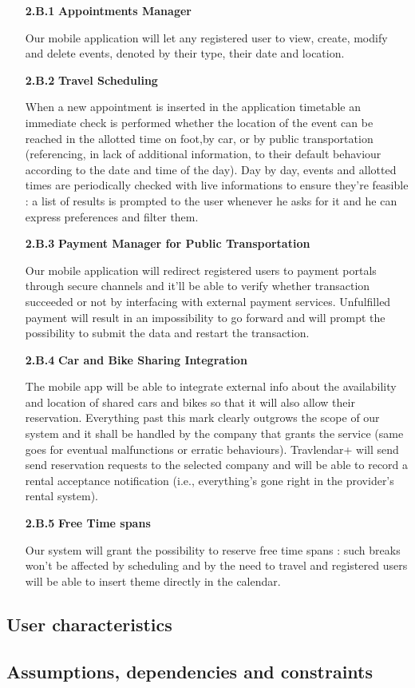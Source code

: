 		\begin{enumerate}

		\item
		[\textbf{2.B.1}] \textbf{Appointments Manager}
		
Our mobile application will let any registered user to view, create, modify and delete events, denoted by their type, their date and location. \\

		\item
		[\textbf{2.B.2}] \textbf{Travel Scheduling}

When a new appointment is inserted in the application timetable an immediate check is performed whether the location of the event can be reached in the allotted time on foot,by car, or by public transportation (referencing, in lack of additional information, to their default behaviour according to the date and time of the day).
Day by day, events and allotted times are periodically checked with live informations to ensure they’re feasible : a list of results is prompted to the user whenever he asks for it and he can express preferences and filter them.\\

		\item
		[\textbf{2.B.3}] \textbf{Payment Manager for Public Transportation}

Our mobile application will redirect registered users to payment portals through secure channels and it’ll be able to verify whether transaction succeeded or not by interfacing with external payment services.
Unfulfilled payment will result in an impossibility to go forward and will prompt the possibility to submit the data and restart the transaction.\\

		\item
		[\textbf{2.B.4}] \textbf{Car and Bike Sharing Integration}

The mobile app will be able to integrate external info about the availability and location of shared cars and bikes so that it will also allow their reservation.
Everything past this mark clearly outgrows the scope of our system and it shall be handled by the company that grants the service (same goes for eventual malfunctions or erratic behaviours). 
Travlendar+ will send send reservation requests to the selected company and will be able to record a rental acceptance notification (i.e., everything’s gone right in the provider’s rental system).\\


		\item
		[\textbf{2.B.5}] \textbf{Free Time spans}

Our system will grant the possibility to reserve free time spans : such breaks won’t be affected by scheduling and by the need to travel and registered users will be able to insert theme directly in the calendar.\\

		\end{enumerate}

			
		\subsection{User characteristics}
			
		\subsection{Assumptions, dependencies and constraints}
